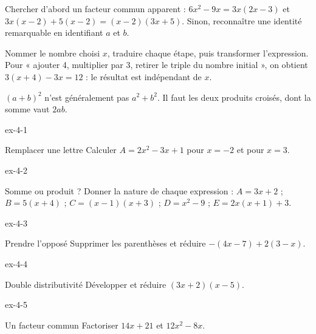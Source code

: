 \begin{savoirfaire}[Factoriser]Chercher d’abord un facteur commun apparent : $6x^2-9x=3x(2x-3)$ et $3x(x-2)+5(x-2)=(x-2)(3x+5)$. Sinon, reconnaître une identité remarquable en identifiant $a$ et $b$.\end{savoirfaire}
\begin{savoirfaire}Nommer le nombre choisi $x$, traduire chaque étape, puis transformer l’expression. Pour « ajouter 4, multiplier par 3, retirer le triple du nombre initial », on obtient $3(x+4)-3x=12$ : le résultat est indépendant de $x$.\end{savoirfaire}
\begin{attention}$(a+b)^2$ n’est généralement pas $a^2+b^2$. Il faut les deux produits croisés, dont la somme vaut $2ab$.\end{attention}
\clearpage{}
\begin{blocLivre}{ex-4-1}\begin{exercice}[1]{Remplacer une lettre}
Calculer $A=2x^2-3x+1$ pour $x=-2$ et pour $x=3$.
\end{exercice}\end{blocLivre}
\begin{blocLivre}{ex-4-2}\begin{exercice}[1]{Somme ou produit ?}
Donner la nature de chaque expression : $A=3x+2$ ; $B=5(x+4)$ ; $C=(x-1)(x+3)$ ; $D=x^2-9$ ; $E=2x(x+1)+3$.
\end{exercice}\end{blocLivre}
\begin{blocLivre}{ex-4-3}\begin{exercice}[1]{Prendre l’opposé}
Supprimer les parenthèses et réduire $-(4x-7)+2(3-x)$.
\end{exercice}\end{blocLivre}
\begin{blocLivre}{ex-4-4}\begin{exercice}[1]{Double distributivité}
Développer et réduire $(3x+2)(x-5)$.
\end{exercice}\end{blocLivre}
\begin{blocLivre}{ex-4-5}\begin{exercice}[1]{Un facteur commun}
Factoriser $14x+21$ et $12x^2-8x$.
\end{exercice}\end{blocLivre}

